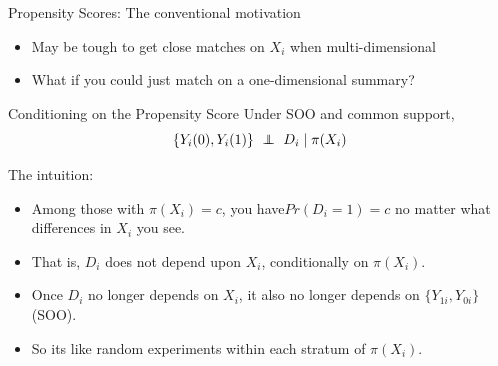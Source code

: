\documentclass[xcolor=dvipsnames]{beamer}
\newcommand\indep{\protect\mathpalette{\protect\independenT}{\perp}}
\def\independenT#1#2{\mathrel{\rlap{$#1#2$}\mkern2mu{#1#2}}}
\begin{document}
\begin{frame}{Propensity Scores: The conventional motivation}
\small 
\begin{itemize}
\item May be tough to get close matches on $X_i$ when multi-dimensional
\item What if you could just match on a one-dimensional summary? 
\end{itemize}
\begin{block}{Conditioning on the Propensity Score}
Under SOO and common support,
\vspace{-.1in}
\[ \{ Y_i(0), Y_i(1)\} \ \indep \ D_i \mid \pi(X_i)\]
\end{block}

 The intuition: 
\begin{itemize}
\item Among those with $\pi(X_i)=c$, you have$Pr(D_i=1)=c$ no matter what differences in $X_i$ you see.
\item That is,  $D_i$ does not depend upon $X_i$, conditionally on $\pi(X_i)$.
\item Once $D_i$ no longer depends on $X_i$, it also no longer depends on $\{Y_{1i},Y_{0i}\}$ (SOO).
\item So its like random experiments within each stratum of $\pi(X_i)$.
\end{itemize}
\end{frame}
 
\end{document}
